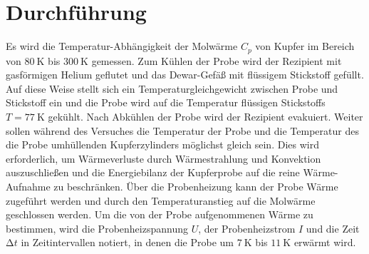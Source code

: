 \section{Durchführung}
\label{sec:durchfuehrung}
Es wird die Temperatur-Abhängigkeit der Molwärme $C_p$ von Kupfer im
Bereich von $\SI{80}{\kelvin}$ bis $\SI{300}{\kelvin}$ gemessen.
Zum Kühlen der Probe wird der Rezipient mit gasförmigen Helium geflutet
und das Dewar-Gefäß mit flüssigem Stickstoff gefüllt.
Auf diese Weise stellt sich ein Temperaturgleichgewicht zwischen Probe und Stickstoff ein und die Probe wird auf die Temperatur flüssigen Stickstoffs $T=\SI{77}{\kelvin}$ \cite{stickstoff} gekühlt.
Nach Abkühlen der Probe wird der Rezipient evakuiert.
Weiter sollen während des Versuches die Temperatur der Probe und die Temperatur des die Probe umhüllenden Kupferzylinders möglichst gleich sein.
Dies wird erforderlich, um Wärmeverluste durch Wärmestrahlung und Konvektion auszuschließen und die Energiebilanz der Kupferprobe auf die reine Wärme-Aufnahme zu beschränken. 
Über die Probenheizung kann der Probe Wärme zugeführt werden und durch den Temperaturanstieg auf die Molwärme geschlossen werden. 
Um die von der Probe aufgenommenen Wärme zu bestimmen, wird die Probenheizspannung $U$, der Probenheizstrom $I$ und die Zeit $\mathup\Delta t$ in Zeitintervallen notiert, 
in denen die Probe um $\SI{7}{\kelvin}$ bis $\SI{11}{\kelvin}$ erwärmt wird.
